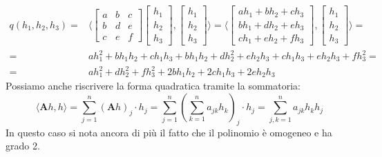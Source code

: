 \begin{align*}
	q(h_1, h_2, h_3) =&
	\langle 
	\begin{bmatrix}
		a & b & c\\
		b & d & e\\
		c & e & f
	\end{bmatrix}
	\begin{bmatrix}
		h_1\\
		h_2\\
		h_3
	\end{bmatrix},
	\begin{bmatrix}
		h_1\\
		h_2\\
		h_3
	\end{bmatrix}
	\rangle = 
	\langle 
	\begin{bmatrix}
		ah_1 + bh_2 + ch_3\\
		bh_1 + dh_2 + eh_3\\
		ch_1 + eh_2 + fh_3
	\end{bmatrix},
	\begin{bmatrix}
		h_1\\
		h_2\\
		h_3
	\end{bmatrix}
	\rangle =\\[5pt]
	=& ah_1^2 + bh_1h_2 + ch_1h_3 + bh_1h_2 + dh_2^2 + eh_2h_3 + ch_1h_3 + 
	eh_2h_3 + fh_3^2 =\\
	=& ah_1^2 + dh_2^2 + fh_3^2 + 2bh_1h_2 + 2ch_1h_3 + 2eh_2h_3 
\end{align*}
Possiamo anche riscrivere la forma quadratica tramite la sommatoria:
\begin{equation*}
	\langle \mathbf{A}h, h \rangle = \sum_{j = 1}^n (\mathbf{A}h)_j \cdot 
	h_j = \sum_{j = 1}^n \left(\sum_{k = 1}^n a_{jk}h_k \right)_j \cdot h_j 
	= \sum_{j,k = 1}^n a_{jk}h_kh_j
\end{equation*}
In questo caso si nota ancora di più il fatto che il polinomio è omogeneo e ha 
grado 2.

